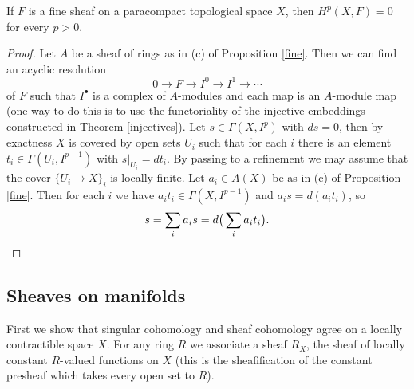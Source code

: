 \begin{prop} If $F$ is a fine sheaf on a paracompact topological space $X$, then $H^p(X,F) = 0$ for every $p > 0$.
\end{prop}
\begin{proof} Let $A$ be a sheaf of rings as in (c) of Proposition \ref{fine}. Then we can find an acyclic resolution
\[
0 \rightarrow F \rightarrow I^0 \rightarrow I^1 \rightarrow \cdots
\]
of $F$ such that $I^\bullet$ is a complex of $A$-modules and each map is an $A$-module map (one way to do this is to use the functoriality of the injective embeddings constructed in Theorem \ref{injectives}). Let $s \in \Gamma(X,I^p)$ with $ds = 0$, then by exactness $X$ is covered by open sets $U_i$ such that for each $i$ there is an element $t_i \in \Gamma(U_i,I^{p-1})$ with $s|_{U_i} = dt_i$. By passing to a refinement we may assume that the cover $\{U_i \rightarrow X\}_i$ is locally finite. Let $a_i \in A(X)$ be as in (c) of Proposition \ref{fine}. Then for each $i$ we have $a_it_i \in \Gamma(X,I^{p-1})$ and $a_is = d(a_it_i)$, so
\[
s = \sum_i a_is = d\big(\sum_i a_it_i\big).\qedhere
\]
\end{proof}

\subsection{Sheaves on manifolds}

First we show that singular cohomology and sheaf cohomology agree on a locally contractible space $X$. For any ring $R$ we associate a sheaf $R_X$, the sheaf of locally constant $R$-valued functions on $X$ (this is the sheafification of the constant presheaf which takes every open set to $R$).

